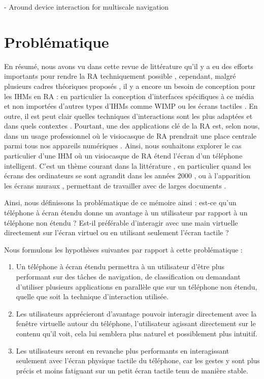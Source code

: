 \cite{Jones2012} - Around device interaction for multiscale navigation


\section{Problématique}
\label{sec:research_problem}
En résumé, nous avons vu dans cette revue de littérature qu'il y a eu des efforts importants pour rendre la RA techniquement possible \citep{Azuma2001, VanKrevelen2010}, cependant, malgré plusieurs cadres théoriques proposés \citep{Milgram1994, Rekimoto1995, Bimber2005, Ens2014a}, il y a encore un besoin de conception pour les IHMs en RA \citep{Billinghurst2015} : en particulier la conception d'interfaces spécifiques à ce média et non importées d'autres types d'IHMs comme WIMP ou les écrans tactiles \citep{VanDam1997, Billinghurst2005}. En outre, il est peut clair quelles techniques d'interactions sont les plus adaptées et dans quels contextes \citep{Argelaguet2013, Piumsomboon2013, Piumsomboon2014}. Pourtant, une des applications clé de la RA est, selon nous, dans un usage professionnel où le visiocasque de RA prendrait une place centrale parmi tous nos appareils numériques \citep{Rekimoto1995, Serrano2015, Grubert2015}. Ainsi, nous souhaitons explorer le cas particulier d'une IHM où un visiocasque de RA étend l'écran d'un téléphone intelligent. C'est un thème courant dans la littérature \citep{Bi2011, Jones2013, Benko2015}, en particulier quand les écrans des ordinateurs se sont agrandit dans les années 2000 \citep{Baudisch2002}, ou à l'apparition les écrans muraux \citep{Liu2014, Berge2014}, permettant de travailler avec de larges documents \citep{Guiard2004}.

Ainsi, nous définissons la problématique de ce mémoire ainsi : est-ce qu'un téléphone à écran étendu donne un avantage à un utilisateur par rapport à un téléphone non étendu ? Est-il préférable d'interagir avec une main virtuelle directement sur l'écran virtuel ou en utilisant seulement l'écran tactile ?

Nous formulons les hypothèses suivantes par rapport à cette problématique :
\begin{enumerate}[label={(H\arabic*)}]
  \item Un téléphone à écran étendu permettra à un utilisateur d'être plus performant sur des tâches de navigation, de classification ou demandant d'utiliser plusieurs applications en parallèle que sur un téléphone non étendu, quelle que soit la technique d'interaction utilisée.
  \item Les utilisateurs apprécieront d'avantage pouvoir interagir directement avec la fenêtre virtuelle autour du téléphone, l'utilisateur agissant directement sur le contenu qu'il voit, cela lui semblera plus naturel et possiblement plus intuitif.
  \item Les utilisateurs seront en revanche plus performants en interagissant seulement avec l'écran physique tactile du téléphone, car les gestes y sont plus précis et moins fatiguant sur un petit écran tactile tenu de manière stable.
\end{enumerate}
\medskip
 
